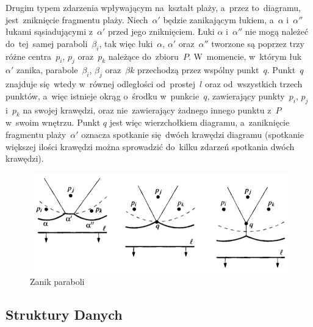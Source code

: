 \documentclass[skorowidz,autorrok,backref,xodstep,oswiadczenie]{wmimgr}
\begin{document}
Drugim typem zdarzenia wpływającym na~kształt plaży, a~przez to~diagramu, jest~zniknięcie fragmentu plaży. Niech~$\alpha'$ będzie zanikającym łukiem, a~$\alpha$ i~$\alpha''$ łukami sąsiadującymi z~$\alpha'$ przed jego zniknięciem. Łuki $\alpha$ i~$\alpha''$ nie mogą należeć do~tej~samej paraboli~$\beta_{i}$, tak więc łuki~$\alpha$, $\alpha'$ oraz~$\alpha''$ tworzone są poprzez trzy różne centra~$p_{i}$, $p_{j}$ oraz~$p_{k}$ należące do~zbioru~$P$. W~momencie, w~którym łuk~$\alpha'$ zanika, parabole~$\beta_{i}$, $\beta_{j}$ oraz~$\beta{k}$ przechodzą przez wspólny punkt~$q$. Punkt~$q$ znajduje się~wtedy w~równej odległości od~prostej~$l$ oraz od~wszystkich trzech punktów, a~więc istnieje okrąg o~środku w~punkcie~$q$, zawierający punkty~$p_{i}$, $p_{j}$ i~$p_{k}$ na swojej krawędzi, oraz nie~zawierający żadnego innego punktu z~$P$ w~swoim wnętrzu. Punkt $q$ jest więc wierzchołkiem diagramu, a~zaniknięcie fragmentu plaży~$\alpha'$ oznacza spotkanie się~dwóch krawędzi diagramu (spotkanie większej ilości krawędzi można sprowadzić do~kilku zdarzeń spotkania dwóch krawędzi).

\begin{figure}[ht!]
\centering
\includegraphics[width=150mm]{images/voronoi6.png}
\caption{Zanik paraboli}
\label{voronoidelarc}
\end{figure}

\subsection{Struktury Danych}
\end{document}
